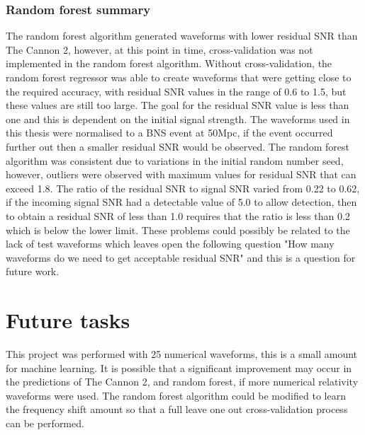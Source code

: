 \subsubsection{Random forest summary}
The random forest algorithm generated waveforms with lower residual SNR than The Cannon 2, however, at this point in time, cross-validation was not implemented in the random forest algorithm. Without cross-validation, the random forest regressor was able to create waveforms that were getting close to the required accuracy, with residual SNR values in the range of 0.6 to 1.5, but these values are still too large. The goal for the residual SNR value is less than one and this is dependent on the initial signal strength. The waveforms used in this thesis were normalised to a BNS event at 50Mpc, if the event occurred further out then a smaller residual SNR would be observed. The random forest algorithm was consistent due to variations in the initial random number seed, however, outliers were observed with maximum values for residual SNR that can exceed 1.8. The ratio of the residual SNR to signal SNR varied from 0.22 to 0.62, if the incoming signal SNR had a detectable value of 5.0 to allow detection, then to obtain a residual SNR of less than 1.0 requires that the ratio is less than 0.2 which is below the lower limit. These problems could possibly be related to the lack of test waveforms which leaves open the following question "How many waveforms do we need to get acceptable residual SNR" and this is a question for future work. 




\section{Future tasks}
This project was performed with 25 numerical waveforms, this is a small amount for machine learning. It is possible that a significant improvement may occur in the predictions of The Cannon 2, and random forest, if more numerical relativity waveforms were used. The random forest algorithm could be modified to learn the frequency shift amount so that a full leave one out cross-validation process can be performed. 

